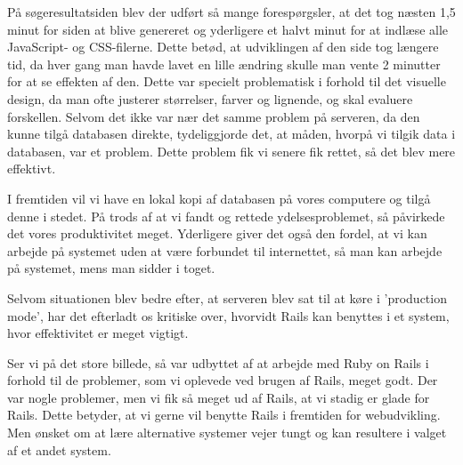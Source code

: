 På søgeresultatsiden blev der udført så mange forespørgsler, at det tog næsten 1,5 minut for siden at blive genereret og yderligere et halvt minut for at indlæse alle JavaScript- og CSS-filerne. Dette betød, at udviklingen af den side tog længere tid, da hver gang man havde lavet en lille ændring skulle man vente 2 minutter for at se effekten af den. Dette var specielt problematisk i forhold til det visuelle design, da man ofte justerer størrelser, farver og lignende, og skal evaluere forskellen. Selvom det ikke var nær det samme problem på serveren, da den kunne tilgå databasen direkte, tydeliggjorde det, at måden, hvorpå vi tilgik data i databasen, var et problem. Dette problem fik vi senere fik rettet, så det blev mere effektivt.

I fremtiden vil vi have en lokal kopi af databasen på vores computere og tilgå denne i stedet. På trods af at vi fandt og rettede ydelsesproblemet, så påvirkede det vores produktivitet meget. Yderligere giver det også den fordel, at vi kan arbejde på systemet uden at være forbundet til internettet, så man \fx kan arbejde på systemet, mens man sidder i toget.

Selvom situationen blev bedre efter, at serveren blev sat til at køre i 'production mode', har det efterladt os kritiske over, hvorvidt Rails kan benyttes i et system, hvor effektivitet er meget vigtigt.

Ser vi på det store billede, så var udbyttet af at arbejde med Ruby on Rails i forhold til de problemer, som vi oplevede ved brugen af Rails, meget godt. Der var nogle problemer, men vi fik så meget ud af Rails, at vi stadig er glade for Rails. Dette betyder, at vi gerne vil benytte Rails i fremtiden for webudvikling. Men ønsket om at lære alternative systemer vejer tungt og kan resultere i valget af et andet system.